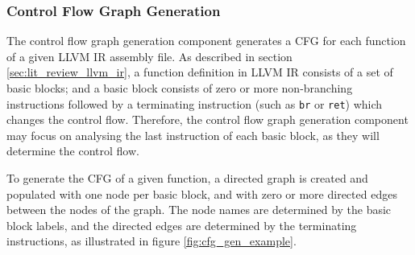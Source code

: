 
\subsubsection{Control Flow Graph Generation}
\label{sec:design_control_flow_graph_generation}

The control flow graph generation component generates a CFG for each function of a given LLVM IR assembly file. As described in section \ref{sec:lit_review_llvm_ir}, a function definition in LLVM IR consists of a set of basic blocks; and a basic block consists of zero or more non-branching instructions followed by a terminating instruction (such as \texttt{br} or \texttt{ret}) which changes the control flow. Therefore, the control flow graph generation component may focus on analysing the last instruction of each basic block, as they will determine the control flow.

To generate the CFG of a given function, a directed graph is created and populated with one node per basic block, and with zero or more directed edges between the nodes of the graph. The node names are determined by the basic block labels, and the directed edges are determined by the terminating instructions, as illustrated in figure \ref{fig:cfg_gen_example}.

